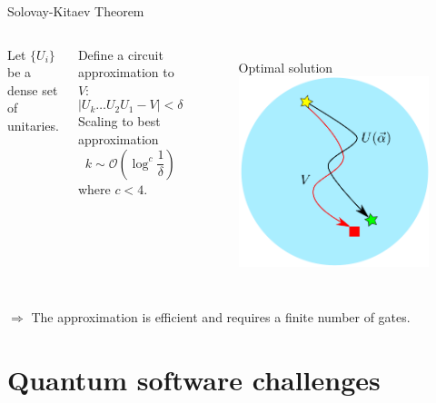 \documentclass[aspectratio=169, 8pt, xcolor={svgnames}, hyperref={linkcolor=black}]{beamer}
\begin{document}
 \begin{frame}[fragile]{Solovay-Kitaev Theorem}

   \begin{columns}
     \column{6cm}
     Let $\{U_i\}$ be a dense set of unitaries.

     Define a circuit approximation to $V$:
   \begin{equation*}
     |U_k \ldots U_2 U _1 - V| < \delta
   \end{equation*}
   Scaling to best approximation
   \begin{equation*}
     k \sim \mathcal{O}\left(\log^c \frac{1}{\delta} \right)
   \end{equation*}
   where $c < 4$.
   \column{5cm}
   \begin{figure}
     {\color{red} Optimal solution}
     \includegraphics[scale=0.22]{figures/drawing2.pdf}
   \end{figure}
   \end{columns}

   \vspace{0.5cm}
   $\Rightarrow$ The approximation is {\color{blue}efficient} and requires a {\color{magenta}finite number of gates}.

 \end{frame}

\section{Quantum software challenges}
\end{document}
